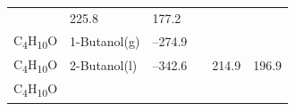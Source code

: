 \documentclass[
  9pt,
]{extbook}
\theoremstyle{definition}
\theoremstyle{definition}
\theoremstyle{definition}
\theoremstyle{remark}
\begin{document}
\begin{longtable}[]{@{}llllll@{}}
\begin{minipage}[t]{0.15\columnwidth}
\strut
\end{minipage} & \begin{minipage}[t]{0.14\columnwidth}\raggedright
225.8\strut
\end{minipage} & \begin{minipage}[t]{0.14\columnwidth}\raggedright
177.2\strut
\end{minipage}\tabularnewline
\begin{minipage}[t]{0.07\columnwidth}\raggedright
C\textsubscript{4}H\textsubscript{10}O\strut
\end{minipage} & \begin{minipage}[t]{0.17\columnwidth}\raggedright
1-Butanol(g)\strut
\end{minipage} & \begin{minipage}[t]{0.15\columnwidth}\raggedright
--274.9\strut
\end{minipage} & \begin{minipage}[t]{0.15\columnwidth}\raggedright
\strut
\end{minipage} & \begin{minipage}[t]{0.14\columnwidth}\raggedright
\strut
\end{minipage} & \begin{minipage}[t]{0.14\columnwidth}\raggedright
\strut
\end{minipage}\tabularnewline
\begin{minipage}[t]{0.07\columnwidth}\raggedright
C\textsubscript{4}H\textsubscript{10}O\strut
\end{minipage} & \begin{minipage}[t]{0.17\columnwidth}\raggedright
2-Butanol(l)\strut
\end{minipage} & \begin{minipage}[t]{0.15\columnwidth}\raggedright
--342.6\strut
\end{minipage} & \begin{minipage}[t]{0.15\columnwidth}\raggedright
\strut
\end{minipage} & \begin{minipage}[t]{0.14\columnwidth}\raggedright
214.9\strut
\end{minipage} & \begin{minipage}[t]{0.14\columnwidth}\raggedright
196.9\strut
\end{minipage}\tabularnewline
\begin{minipage}[t]{0.07\columnwidth}\raggedright
C\textsubscript{4}H\textsubscript{10}O\strut
\end{minipage} & \begin{minipage}[t]{0.17\columnwidth}\raggedright

\end{minipage}
\end{longtable}
\end{document}
